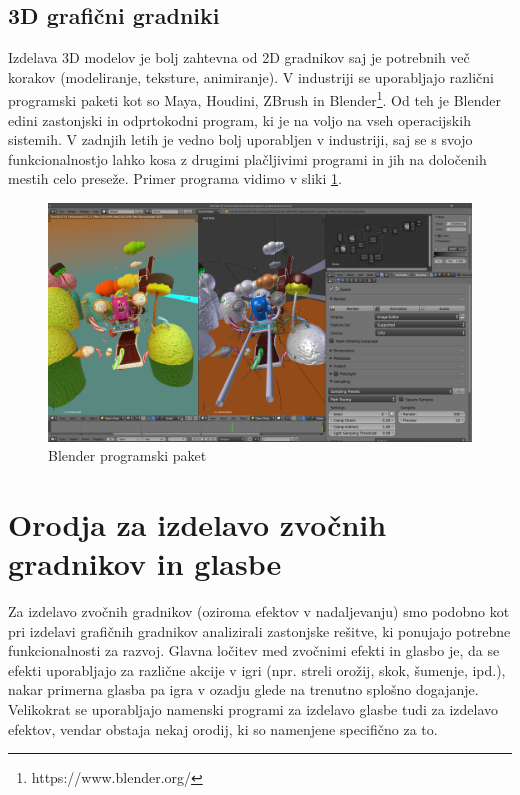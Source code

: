 \documentclass[12pt,a4paper,twoside]{book}
\begin{document}
\subsection{3D grafični gradniki}
Izdelava 3D modelov je bolj zahtevna od 2D gradnikov saj je potrebnih več korakov (modeliranje, teksture, animiranje). V industriji se uporabljajo različni programski paketi kot so Maya, Houdini, ZBrush in Blender\footnote{https://www.blender.org/}. Od teh je Blender edini zastonjski in odprtokodni program, ki je na voljo na vseh operacijskih sistemih. V zadnjih letih je vedno bolj uporabljen v industriji, saj se s svojo funkcionalnostjo lahko kosa z drugimi plačljivimi programi in jih na določenih mestih celo preseže. Primer programa vidimo v sliki \ref{slika:blenderDemo}.

\begin{figure}[h]
	\centering
	\includegraphics[width=13cm]{blenderDemo}
	\caption{Blender programski paket}
	\label{slika:blenderDemo}
\end{figure}

\section{Orodja za izdelavo zvočnih gradnikov in glasbe}
Za izdelavo zvočnih gradnikov (oziroma efektov v nadaljevanju) smo podobno kot pri izdelavi grafičnih gradnikov analizirali zastonjske rešitve, ki ponujajo potrebne funkcionalnosti za razvoj. Glavna ločitev med zvočnimi efekti in glasbo je, da se efekti uporabljajo za različne akcije v igri (npr. streli orožij, skok, šumenje, ipd.), nakar primerna glasba pa igra v ozadju glede na trenutno splošno dogajanje. Velikokrat se uporabljajo namenski programi za izdelavo glasbe tudi za izdelavo efektov, vendar obstaja nekaj orodij, ki so namenjene specifično za to.
\end{document}
